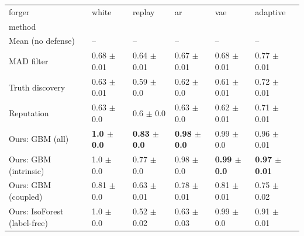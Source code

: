 \begin{tabular}{llllll}
\toprule
forger & white & replay & ar & vae & adaptive \\
method &  &  &  &  &  \\
\midrule
Mean (no defense) & -- & -- & -- & -- & -- \\
MAD filter & 0.68 $\pm$ 0.01 & 0.64 $\pm$ 0.01 & 0.67 $\pm$ 0.01 & 0.68 $\pm$ 0.01 & 0.77 $\pm$ 0.01 \\
Truth discovery & 0.63 $\pm$ 0.01 & 0.59 $\pm$ 0.0 & 0.62 $\pm$ 0.0 & 0.61 $\pm$ 0.01 & 0.72 $\pm$ 0.01 \\
Reputation & 0.63 $\pm$ 0.0 & 0.6 $\pm$ 0.0 & 0.63 $\pm$ 0.0 & 0.62 $\pm$ 0.01 & 0.71 $\pm$ 0.01 \\
Ours: GBM (all) & \textbf{1.0 $\pm$ 0.0} & \textbf{0.83 $\pm$ 0.0} & \textbf{0.98 $\pm$ 0.0} & 0.99 $\pm$ 0.0 & 0.96 $\pm$ 0.01 \\
Ours: GBM (intrinsic) & 1.0 $\pm$ 0.0 & 0.77 $\pm$ 0.0 & 0.98 $\pm$ 0.0 & \textbf{0.99 $\pm$ 0.0} & \textbf{0.97 $\pm$ 0.01} \\
Ours: GBM (coupled) & 0.81 $\pm$ 0.0 & 0.63 $\pm$ 0.01 & 0.78 $\pm$ 0.01 & 0.81 $\pm$ 0.01 & 0.75 $\pm$ 0.02 \\
Ours: IsoForest (label-free) & 1.0 $\pm$ 0.0 & 0.52 $\pm$ 0.02 & 0.63 $\pm$ 0.03 & 0.99 $\pm$ 0.0 & 0.91 $\pm$ 0.01 \\
\bottomrule
\end{tabular}

